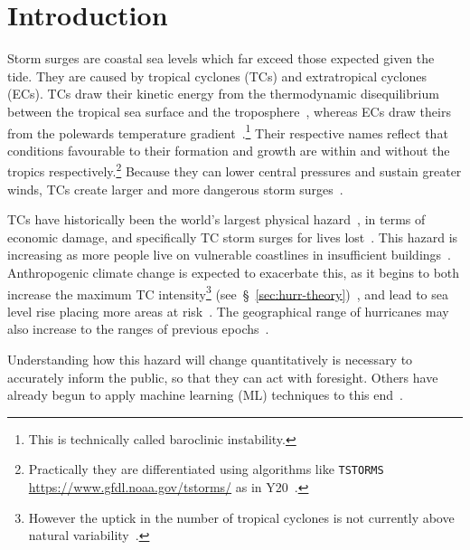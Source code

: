 \section{Introduction}
\label{sec:1_Introduction}


Storm surges are coastal sea levels which far exceed those
expected given the tide.
They are caused by tropical cyclones
(TCs) and extratropical cyclones (ECs).
TCs draw their kinetic energy from the thermodynamic disequilibrium between
the tropical sea surface and the troposphere~\cite{emanuel1986air, emanuel1987dependence},
whereas ECs draw theirs from the
polewards temperature gradient~\cite{lorenz1960energy, holton2004introduction}.\footnote{This is technically called baroclinic instability.}
Their respective names reflect that conditions favourable
to their formation and growth are within and without the tropics respectively.\footnote{
Practically they are differentiated using algorithms like \texttt{TSTORMS}
\url{https://www.gfdl.noaa.gov/tstorms/} as in Y20~\cite{ZannaPreprint}.}
Because they can lower central pressures and sustain greater winds,
TCs create larger and more dangerous storm surges~\cite{emanuel2005divine}.

TCs have historically been the
world's largest physical hazard~\cite{shultz2005epidemiology},
in terms of economic damage, and specifically TC storm surges for lives lost~\cite{zhang2009tropical}.
This hazard is increasing as more people live on vulnerable coastlines
in insufficient buildings~\cite{emanuel2005divine}.
Anthropogenic climate change is expected to exacerbate this,
as it begins to both increase the maximum TC intensity\footnote{However the uptick
in the number of tropical cyclones is not currently above
 natural variability~\cite{mendelsohn2012impact}.}
(see~§~\ref{sec:hurr-theory})~\cite{emanuel2008hurricanes,emanuel2017will},
and lead to sea level rise placing more areas at risk~\cite{SROCC}.
The geographical range of hurricanes may also increase
to the ranges of previous epochs~\cite{fedorov2010tropical}.

Understanding how this hazard will change quantitatively
is necessary to accurately
inform the public,
so that they can act with foresight.
Others have already begun to apply machine learning (ML) techniques to this
end~\cite{kulp2019new, kulp2018coastaldem, tadesse2020data}.





